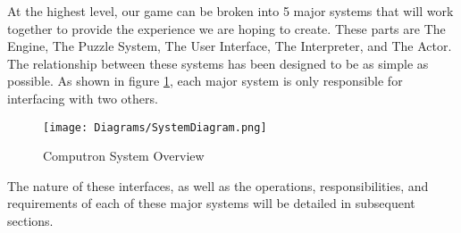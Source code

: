 At the highest level, our game can be broken into 5 major systems that will work together to provide the experience we are hoping to create. These parts are The Engine, The Puzzle System, The User Interface, The Interpreter, and The Actor. The relationship between these systems has been designed to be as simple as possible. As shown in figure \ref{fig:overall_system_diagram}, each major system is only responsible for interfacing with two others. 

\begin{figure}[!hb]
    \caption{Computron System Overview}
    \label{fig:overall_system_diagram}
    \centering
    \texttt{[image: Diagrams/SystemDiagram.png]}
\end{figure}

The nature of these interfaces, as well as the operations, responsibilities, and requirements of each of these major systems will be detailed in subsequent sections.